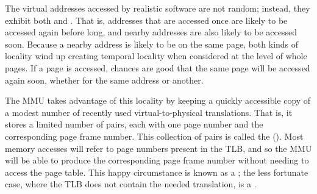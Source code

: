 The virtual addresses accessed by realistic software are not random;
instead, they exhibit both  and .
That is, addresses that are accessed once are likely to be accessed
again before long, and nearby addresses are also likely to be accessed
soon.  Because a nearby address is likely to be on the same page, both
kinds of locality wind up creating temporal locality when considered
at the level of whole pages.  If a page is accessed, chances are good
that the same page will be accessed again soon, whether for the same
address or another.

The MMU takes advantage of this locality by keeping a
quickly accessible copy of a modest number of recently used
virtual-to-physical translations.  That is, it stores a limited number
of pairs, each with one page number and the corresponding page frame
number.  This collection of pairs is called the  ().  Most memory accesses will refer to
page numbers present in the TLB, and so the MMU will be able to
produce the corresponding page frame number without needing to access
the page table.  This happy circumstance is known as a ; the
less fortunate case, where the TLB does not contain the needed
translation, is a .

